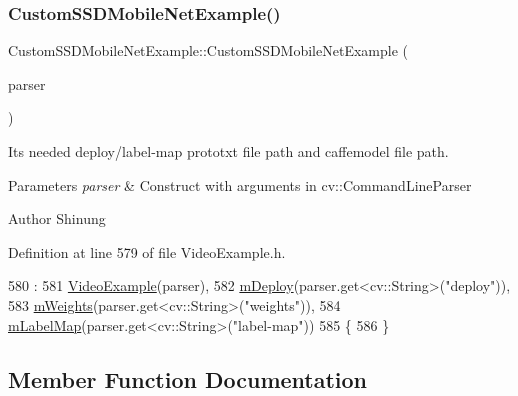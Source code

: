 \subsubsection{\texorpdfstring{Custom\+S\+S\+D\+Mobile\+Net\+Example()}{CustomSSDMobileNetExample()}}
{\footnotesize\ttfamily Custom\+S\+S\+D\+Mobile\+Net\+Example\+::\+Custom\+S\+S\+D\+Mobile\+Net\+Example (\begin{DoxyParamCaption}\item[{const cv\+::\+Command\+Line\+Parser \&}]{parser }\end{DoxyParamCaption})\hspace{0.3cm}{\ttfamily [inline]}}



It\textquotesingle{}s needed deploy/label-\/map prototxt file path and caffemodel file path. 


\begin{DoxyParams}{Parameters}
{\em parser} & Construct with arguments in cv\+::\+Command\+Line\+Parser \\
\hline
\end{DoxyParams}
\begin{DoxyAuthor}{Author}
Shinung 
\end{DoxyAuthor}


Definition at line 579 of file Video\+Example.\+h.


\begin{DoxyCode}
580         :
581         \mbox{\hyperlink{class_video_example_aedc40ab44835e8ad1cf731b7709cd4ac}{VideoExample}}(parser),
582         \mbox{\hyperlink{class_custom_s_s_d_mobile_net_example_a5f0ab35a8bb7c9bbe48750551472d5bd}{mDeploy}}(parser.get<cv::String>(\textcolor{stringliteral}{"deploy"})),
583         \mbox{\hyperlink{class_custom_s_s_d_mobile_net_example_a3828507c8d2af5d9ba6f5a7de7fa3b42}{mWeights}}(parser.get<cv::String>(\textcolor{stringliteral}{"weights"})),
584         \mbox{\hyperlink{class_custom_s_s_d_mobile_net_example_a15b05488bca85e442ba403ff02a24b5f}{mLabelMap}}(parser.get<cv::String>(\textcolor{stringliteral}{"label-map"}))
585     \{
586     \}
\end{DoxyCode}


\subsection{Member Function Documentation}
\mbox{\label{class_video_example_ace8617201da40b6e230bd6c049b48aa0}} 
